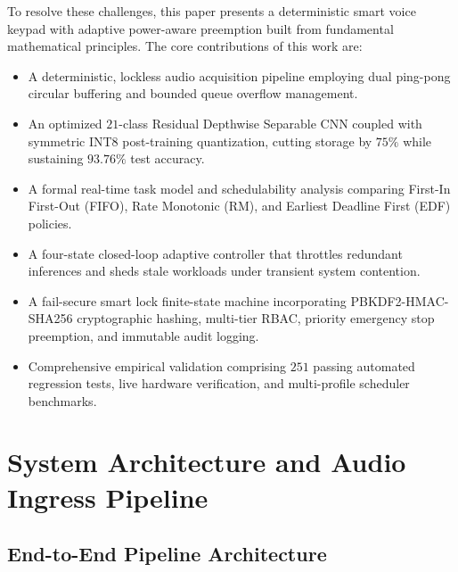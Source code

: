 \documentclass[10pt,twocolumn,letterpaper]{article}
\begin{document}
To resolve these challenges, this paper presents a deterministic smart voice keypad with adaptive power-aware preemption built from fundamental mathematical principles. The core contributions of this work are:
\begin{itemize}
    \item A deterministic, lockless audio acquisition pipeline employing dual ping-pong circular buffering and bounded queue overflow management.
    \item An optimized $21$-class Residual Depthwise Separable CNN coupled with symmetric INT8 post-training quantization, cutting storage by $75\%$ while sustaining $93.76\%$ test accuracy.
    \item A formal real-time task model and schedulability analysis comparing First-In First-Out (FIFO), Rate Monotonic (RM), and Earliest Deadline First (EDF) policies.
    \item A four-state closed-loop adaptive controller that throttles redundant inferences and sheds stale workloads under transient system contention.
    \item A fail-secure smart lock finite-state machine incorporating PBKDF2-HMAC-SHA256 cryptographic hashing, multi-tier RBAC, priority emergency stop preemption, and immutable audit logging.
    \item Comprehensive empirical validation comprising $251$ passing automated regression tests, live hardware verification, and multi-profile scheduler benchmarks.
\end{itemize}

\section{System Architecture and Audio Ingress Pipeline}

\subsection{End-to-End Pipeline Architecture}
\end{document}
